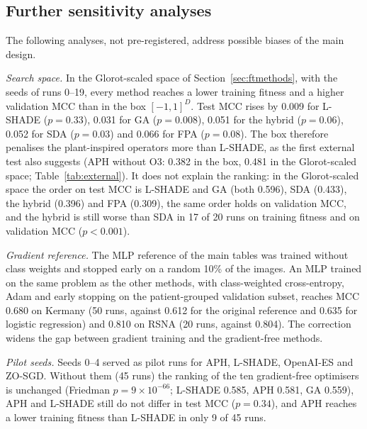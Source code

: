 \documentclass[preprint,12pt]{elsarticle}
\begin{document}


\subsection{Further sensitivity analyses}\label{sec:sensitivity}
The following analyses, not pre-registered, address possible biases of the main design.

\emph{Search space.} In the Glorot-scaled space of Section~\ref{sec:ftmethods}, with the seeds of runs 0--19, every method reaches a lower training fitness and a higher validation MCC than in the box $[-1,1]^D$. Test MCC rises by 0.009 for L-SHADE ($p=0.33$), 0.031 for GA ($p=0.008$), 0.051 for the hybrid ($p=0.06$), 0.052 for SDA ($p=0.03$) and 0.066 for FPA ($p=0.08$). The box therefore penalises the plant-inspired operators more than L-SHADE, as the first external test also suggests (APH without O3: 0.382 in the box, 0.481 in the Glorot-scaled space; Table~\ref{tab:external}). It does not explain the ranking: in the Glorot-scaled space the order on test MCC is L-SHADE and GA (both 0.596), SDA (0.433), the hybrid (0.396) and FPA (0.309), the same order holds on validation MCC, and the hybrid is still worse than SDA in 17 of 20 runs on training fitness and on validation MCC ($p<0.001$).

\emph{Gradient reference.} The MLP reference of the main tables was trained without class weights and stopped early on a random 10\% of the images. An MLP trained on the same problem as the other methods, with class-weighted cross-entropy, Adam and early stopping on the patient-grouped validation subset, reaches MCC 0.680 on Kermany (50 runs, against 0.612 for the original reference and 0.635 for logistic regression) and 0.810 on RSNA (20 runs, against 0.804). The correction widens the gap between gradient training and the gradient-free methods.

\emph{Pilot seeds.} Seeds 0--4 served as pilot runs for APH, L-SHADE, OpenAI-ES and ZO-SGD. Without them (45 runs) the ranking of the ten gradient-free optimisers is unchanged (Friedman $p=9\times10^{-66}$; L-SHADE 0.585, APH 0.581, GA 0.559), APH and L-SHADE still do not differ in test MCC ($p=0.34$), and APH reaches a lower training fitness than L-SHADE in only 9 of 45 runs.
\end{document}
